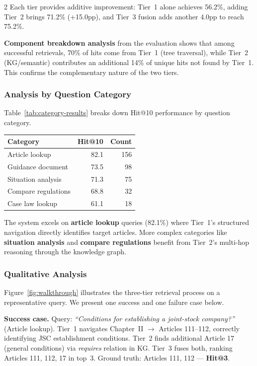 \documentclass[11pt,a4paper]{article}
\begin{document}
\begin{multicols}{2}
Each tier provides additive improvement: Tier~1 alone achieves 56.2\%, adding Tier~2 brings 71.2\% (+15.0pp), and Tier~3 fusion adds another 4.0pp to reach 75.2\%.

\textbf{Component breakdown analysis} from the evaluation shows that among successful retrievals, 70\% of hits come from Tier~1 (tree traversal), while Tier~2 (KG/semantic) contributes an additional 14\% of unique hits not found by Tier~1. This confirms the complementary nature of the two tiers.

\subsubsection{Analysis by Question Category}

Table~\ref{tab:category-results} breaks down Hit@10 performance by question category.

\vspace{0.3em}
\noindent
\centering\small
{}
\label{tab:category-results}
\begin{tabular}{lrr}
\toprule
\textbf{Category} & \textbf{Hit@10} & \textbf{Count} \\
\midrule
Article lookup & 82.1 & 156 \\
Guidance document & 73.5 & 98 \\
Situation analysis & 71.3 & 75 \\
Compare regulations & 68.8 & 32 \\
Case law lookup & 61.1 & 18 \\
\bottomrule
\end{tabular}
\normalsize
\justifying
\vspace{0.3em}

The system excels on \textbf{article lookup} queries (82.1\%) where Tier~1's structured navigation directly identifies target articles. More complex categories like \textbf{situation analysis} and \textbf{compare regulations} benefit from Tier~2's multi-hop reasoning through the knowledge graph.

\subsubsection{Qualitative Analysis}

Figure~\ref{fig:walkthrough} illustrates the three-tier retrieval process on a representative query. We present one success and one failure case below.

\textbf{Success case.} Query: \textit{``Conditions for establishing a joint-stock company?''} (Article lookup). Tier~1 navigates Chapter~II $\rightarrow$ Articles 111--112, correctly identifying JSC establishment conditions. Tier~2 finds additional Article 17 (general conditions) via \textit{requires} relation in KG. Tier~3 fuses both, ranking Articles 111, 112, 17 in top~3. Ground truth: Articles 111, 112 --- \textbf{Hit@3}.


\end{multicols}
\end{document}
